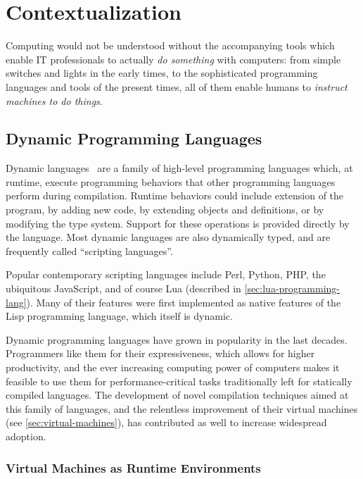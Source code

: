 
\chapter{Contextualization}

Computing would not be understood without the accompanying tools which enable
IT professionals to actually \emph{do something} with computers: from simple
switches and lights in the early times, to the sophisticated programming
languages and tools of the present times, all of them enable humans to
\emph{instruct machines to do things}.


\section{Dynamic Programming Languages}

Dynamic languages~\cite{tratt-dynamic-langs} are a family of high-level
programming languages which, at runtime, execute programming behaviors that
other programming languages perform during compilation. Runtime behaviors
could include extension of the program, by adding new code, by extending
objects and definitions, or by modifying the type system. Support for these
operations is provided directly by the language. Most dynamic languages are
also dynamically typed, and are frequently called “scripting languages”.

Popular contemporary scripting languages include Perl, Python, PHP, the
ubiquitous JavaScript, and of course Lua (described in
\autoref{sec:lua-programming-lang}). Many of their features were first
implemented as native features of the Lisp programming language, which itself
is dynamic.

Dynamic programming languages have grown in popularity in the last decades.
Programmers like them for their expressiveness, which allows for higher
productivity, and the ever increasing computing power of computers makes it
feasible to use them for performance-critical tasks traditionally left for
statically compiled languages. The development of novel compilation techniques
aimed at this family of languages, and the relentless improvement of their
virtual machines (see \autoref{sec:virtual-machines}), has contributed as well
to increase widespread adoption.

\subsection{Virtual Machines as Runtime Environments}
  \label{sec:virtual-machines}

